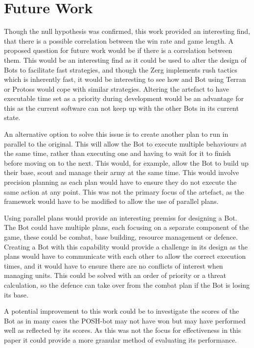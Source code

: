 \documentclass[journal]{IEEEtran}
\begin{document}
	\section{Future Work}
	Though the null hypothesis was confirmed, this work provided an interesting find, that there is a possible correlation between the win rate and game length. A proposed question for future work would be if there is a correlation between them. This would be an interesting find as it could be used to alter the design of Bots to facilitate fast strategies, and though the Zerg implements rush tactics which is inherently fast, it would be interesting to see how and Bot using Terran or Protoss would cope with similar strategies.
	Altering the artefact to have executable time set as a priority during development would be an advantage for this as the current software can not keep up with the other Bots in its current state.
	
	An alternative option to solve this issue is to create another plan to run in parallel to the original. This will allow the Bot to execute multiple behaviours at the same time, rather than executing one and having to wait for it to finish before moving on to the next. This would, for example, allow the Bot to build up their base, scout and manage their army at the same time. This would involve precision planning as each plan would have to ensure they do not execute the same action at any point. This was not the primary focus of the artefact, as the framework would have to be modified to allow the use of parallel plans.
	
	Using parallel plans would provide an interesting premiss for designing a Bot. The Bot could have multiple plans, each focusing on a separate component of the game, these could be combat, base building, resource management or defence. Creating a Bot with this capability would provide a challenge in its design as the plans would have to communicate with each other to allow the correct execution times, and it would have to ensure there are no conflicts of interest when managing units. This could be solved with an order of priority or a threat calculation, so the defence can take over from the combat plan if the Bot is losing its base.
	
	A potential improvement to this work could be to investigate the scores of the Bot as in many cases the POSH-bot may not have won but may have performed well as reflected by its scores. As this was not the focus for effectiveness in this paper it could provide a more granular method of evaluating its performance. 
	
\end{document}
